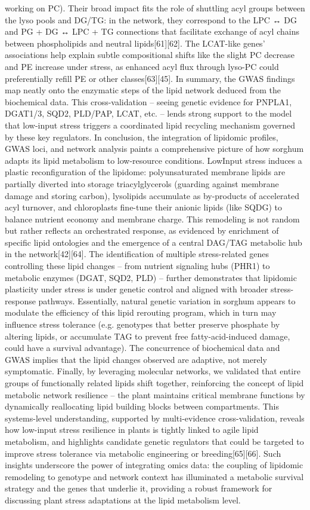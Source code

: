 \documentclass[10pt,letterpaper]{article}
\begin{document}
working on PC). Their broad impact fits the role of shuttling acyl groups between the lyso pools and DG/TG: in the network, they correspond to the LPC ↔ DG and PG + DG ↔ LPC + TG connections that facilitate exchange of acyl chains between phospholipids and neutral lipids[61][62]. The LCAT-like genes’ associations help explain subtle compositional shifts like the slight PC decrease and PE increase under stress, as enhanced acyl flux through lyso-PC could preferentially refill PE or other classes[63][45]. In summary, the GWAS findings map neatly onto the enzymatic steps of the lipid network deduced from the biochemical data. This cross-validation – seeing genetic evidence for PNPLA1, DGAT1/3, SQD2, PLD/PAP, LCAT, etc. – lends strong support to the model that low-input stress triggers a coordinated lipid recycling mechanism governed by these key regulators.
In conclusion, the integration of lipidomic profiles, GWAS loci, and network analysis paints a comprehensive picture of how sorghum adapts its lipid metabolism to low-resource conditions. LowInput stress induces a plastic reconfiguration of the lipidome: polyunsaturated membrane lipids are partially diverted into storage triacylglycerols (guarding against membrane damage and storing carbon), lysolipids accumulate as by-products of accelerated acyl turnover, and chloroplasts fine-tune their anionic lipids (like SQDG) to balance nutrient economy and membrane charge. This remodeling is not random but rather reflects an orchestrated response, as evidenced by enrichment of specific lipid ontologies and the emergence of a central DAG/TAG metabolic hub in the network[42][64]. The identification of multiple stress-related genes controlling these lipid changes – from nutrient signaling hubs (PHR1) to metabolic enzymes (DGAT, SQD2, PLD) – further demonstrates that lipidomic plasticity under stress is under genetic control and aligned with broader stress-response pathways. Essentially, natural genetic variation in sorghum appears to modulate the efficiency of this lipid rerouting program, which in turn may influence stress tolerance (e.g. genotypes that better preserve phosphate by altering lipids, or accumulate TAG to prevent free fatty-acid-induced damage, could have a survival advantage). The concurrence of biochemical data and GWAS implies that the lipid changes observed are adaptive, not merely symptomatic. Finally, by leveraging molecular networks, we validated that entire groups of functionally related lipids shift together, reinforcing the concept of lipid metabolic network resilience – the plant maintains critical membrane functions by dynamically reallocating lipid building blocks between compartments. This systems-level understanding, supported by multi-evidence cross-validation, reveals how low-input stress resilience in plants is tightly linked to agile lipid metabolism, and highlights candidate genetic regulators that could be targeted to improve stress tolerance via metabolic engineering or breeding[65][66]. Such insights underscore the power of integrating omics data: the coupling of lipidomic remodeling to genotype and network context has illuminated a metabolic survival strategy and the genes that underlie it, providing a robust framework for discussing plant stress adaptations at the lipid metabolism level.
\end{document}

